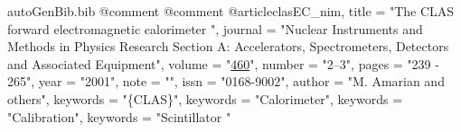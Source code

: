\begin{filecontents*}{autoGenBib.bib}
@comment %
@comment %
@article{clasEC_nim,
title = "{The {CLAS} forward electromagnetic calorimeter }",
journal = "{Nuclear Instruments and Methods in Physics Research Section A: Accelerators, Spectrometers, Detectors and Associated Equipment}",
volume = "\href{http://www.sciencedirect.com/science/article/pii/S0168900200009967}{460}",
number = "2–3",
pages = "239 - 265",
year = "2001",
note = "",
issn = "0168-9002",
author = "M. Amarian and others",
keywords = "\{CLAS\}",
keywords = "Calorimeter",
keywords = "Calibration",
keywords = "Scintillator "
}


\end{filecontents*}
